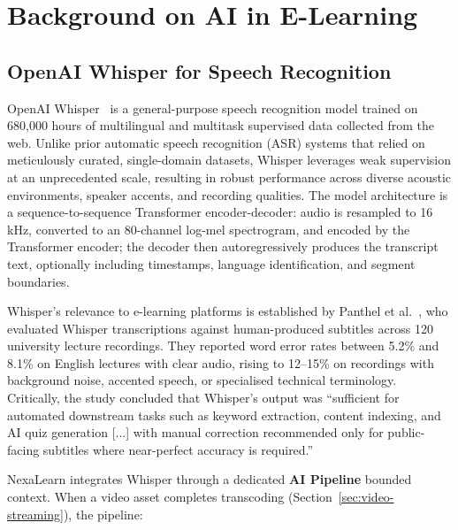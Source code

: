 
\section{Background on AI in E-Learning}
\label{sec:ai-elearning}

\subsection{OpenAI Whisper for Speech Recognition}

OpenAI Whisper~\cite{radford2023whisper} is a general-purpose speech recognition model trained on 680,000 hours of multilingual and multitask supervised data collected from the web. Unlike prior automatic speech recognition (ASR) systems that relied on meticulously curated, single-domain datasets, Whisper leverages weak supervision at an unprecedented scale, resulting in robust performance across diverse acoustic environments, speaker accents, and recording qualities. The model architecture is a sequence-to-sequence Transformer encoder-decoder: audio is resampled to 16 kHz, converted to an 80-channel log-mel spectrogram, and encoded by the Transformer encoder; the decoder then autoregressively produces the transcript text, optionally including timestamps, language identification, and segment boundaries.

Whisper's relevance to e-learning platforms is established by Panthel et al.~\cite{panthel2024whisper}, who evaluated Whisper transcriptions against human-produced subtitles across 120 university lecture recordings. They reported word error rates between 5.2\% and 8.1\% on English lectures with clear audio, rising to 12--15\% on recordings with background noise, accented speech, or specialised technical terminology. Critically, the study concluded that Whisper's output was ``sufficient for automated downstream tasks such as keyword extraction, content indexing, and AI quiz generation [...] with manual correction recommended only for public-facing subtitles where near-perfect accuracy is required.''

NexaLearn integrates Whisper through a dedicated \textbf{AI Pipeline} bounded context. When a video asset completes transcoding (Section~\ref{sec:video-streaming}), the pipeline:

